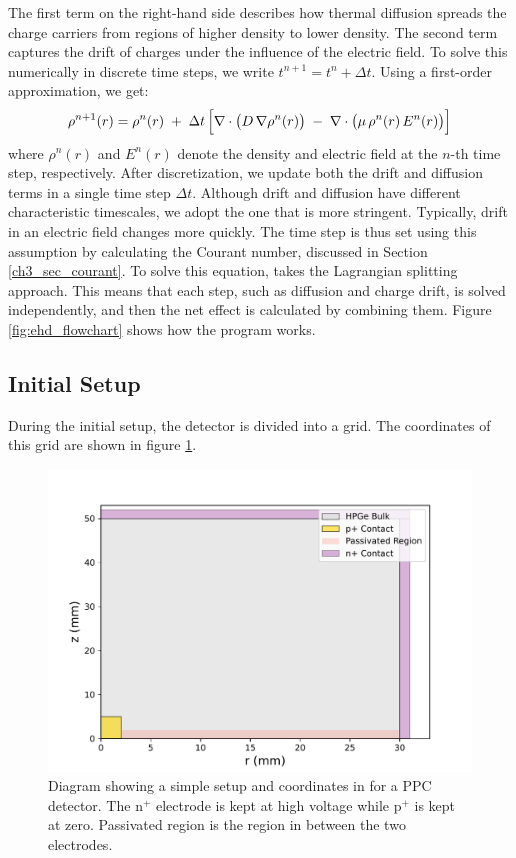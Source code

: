 The first term on the right-hand side describes how thermal diffusion spreads the charge carriers from regions of higher density to lower density. The second term captures the drift of  charges under the influence of the electric field. To solve this numerically in discrete time steps, we write $t^{n+1} = t^n + \Delta t$. Using a first-order approximation, we get:
\begin{equation}\label{ch3_eq_ehdrift_discrete}
\rho^{n+1}({r}) 
=
\rho^n({r})
\;+\;
\Delta t \,
\Bigl[
\nabla \cdot \bigl(D\,\nabla\rho^n({r})\bigr)
\;-\;
\nabla \cdot \bigl(\mu\,\rho^n({r})\,{E}^n({r})\bigr)
\Bigr]
\end{equation}
where $\rho^n({r})$ and ${E}^n({r})$ denote the density and electric field at
the $n$-th time step, respectively. After discretization, we update both the drift and diffusion terms in a single time step $\Delta t$. Although drift and diffusion have different characteristic timescales, we adopt the one that is more stringent. Typically, drift in an electric field changes more quickly. The time step is thus set using this assumption by calculating the Courant number, discussed in Section \ref{ch3_sec_courant}. To solve this equation, {\ehd} takes the Lagrangian splitting approach. This means that each step, such as diffusion and charge drift, is solved independently, and then the net effect is calculated by combining them. Figure \ref{fig:ehd_flowchart} shows how the {\ehd} program works. 

\subsection{Initial Setup}
During the initial setup, the detector is divided into a grid. The coordinates of this grid are shown in figure \ref{ch3_fig_coordinates}.

\begin{figure}[!htb]
\centering
\includegraphics[width=0.9\linewidth,trim={0pc 0pc 0pc 0pc},clip]{ch3/figs/ppc_coordinates.pdf}
\caption{Diagram showing a simple setup and coordinates in {\ehd} for a PPC detector. The n$^+$ electrode is kept at high voltage while p$^+$ is kept at zero. Passivated region is the region in between the two electrodes.}
\label{ch3_fig_coordinates}
\end{figure}

